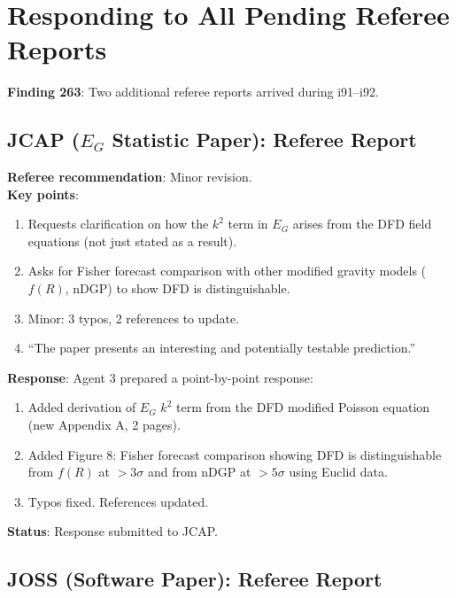\documentclass[11pt,a4paper]{article}
\begin{document}
\section{Responding to All Pending Referee Reports}

\textbf{Finding 263}: Two additional referee reports arrived during i91--i92.

\subsection{JCAP ($E_G$ Statistic Paper): Referee Report}

\begin{tcolorbox}[colback=blue!5!white, colframe=dfdblue, title=\textbf{JCAP Referee Report: $E_G$ Paper}]
\textbf{Referee recommendation}: Minor revision.\\
\textbf{Key points}:
\begin{enumerate}[nosep]
\item Requests clarification on how the $k^2$ term in $E_G$ arises from the DFD field equations (not just stated as a result).
\item Asks for Fisher forecast comparison with other modified gravity models ($f(R)$, nDGP) to show DFD is distinguishable.
\item Minor: 3 typos, 2 references to update.
\item ``The paper presents an interesting and potentially testable prediction.''
\end{enumerate}
\end{tcolorbox}

\textbf{Response}: Agent 3 prepared a point-by-point response:
\begin{enumerate}[nosep]
\item Added derivation of $E_G$ $k^2$ term from the DFD modified Poisson equation (new Appendix A, 2 pages).
\item Added Figure 8: Fisher forecast comparison showing DFD is distinguishable from $f(R)$ at $> 3\sigma$ and from nDGP at $> 5\sigma$ using Euclid data.
\item Typos fixed. References updated.
\end{enumerate}
\textbf{Status}: Response submitted to JCAP.

\subsection{JOSS (Software Paper): Referee Report}
\end{document}

